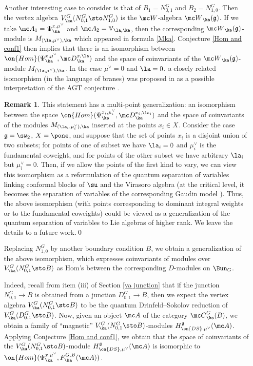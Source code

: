 \documentclass[11pt,reqno]{amsart}
\theoremstyle{plain}
\numberwithin{equation}{section}
\newcommand{\g}{\mathfrak{g}}
\theoremstyle{definition}
\newtheorem{rem}{Remark}[section]
\begin{document}
\bigskip

Another interesting case to consider is that of $B_1 = N^G_{0,1}$ and
$B_2 = N^G_{1,0}$. Then the vertex algebra $V^G_\ka(N^G_{0,1} \sto
N^G_{1,0})$ is the ${\mc W}$-algebra ${\mc W}_\ka(\g)$. If we take
${\mc A}_1 = \Psi^{x,\mu^\vee}_\ka$ and ${\mc A}_2 = {\mathbb
  V}_{\la,\ka}$, then the corresponding ${\mc W}_\ka(\g)$-module is
$M_{(\la,\mu^\vee),\ka}$ which appeared in formula
\eqref{Mka}. Conjecture \ref{Hom and conf1} then implies that there is
an isomorphism between $\on{Hom}(\Psi^{x,\mu^\vee}_\ka,{\mc
  D}^{x,\la}_\ka)$ and the space of coinvariants of the ${\mc
  W}_\ka(\g)$-module $M_{(\la,\mu^\vee),\ka}$. In the case $\mu^\vee =
0$ and $\la=0$, a closely related isomorphism (in the language of
branes) was proposed in \cite{NW} as a possible interpretation of the
AGT conjecture \cite{AGT}.

\begin{rem}
  This statement has a multi-point generalization: an isomorphism
  between the space $\on{Hom}(\Psi^{x_i,\mu^\vee_i}_\ka,{\mc
    D}^{x_i,\la_i}_\ka)$ and the space of coinvariants of the modules
  $M_{(\la_i,\mu^\vee_i),\ka}$ inserted at the points $x_i \in
  X$. Consider the case $\g=\sw_2$, $X=\pone$, and suppose that the
  set of points $x_i$ is a disjoint union of two subsets; for points
  of one of subset we have $\la_i=0$ and $\mu^\vee_i$ is the
  fundamental coweight, and for points of the other subset we have
  arbitrary $\la_i$ but $\mu^\vee_i=0$. Then, if we allow the
  points of the first kind to vary, we can view this isomorphism as a
  reformulation of the quantum separation of variables linking
  conformal blocks of $\su$ and the Virasoro algebra
  \cite{Stoyan,JT,FGT} (at the critical level, it becomes the
  separation of variables of the corresponding Gaudin model
  \cite{Frenkel1}). Thus, the above isomorphism (with points
  corresponding to dominant integral weights or to the fundamental
  coweights) could be viewed as a generalization of the quantum
  separation of variables to Lie algebras of higher rank. We leave the
  details to a future work.\qed
\end{rem}

Replacing $N^G_{1,0}$ by another boundary condition $B$, we obtain a
generalization of the above isomorphism, which expresses coinvariants
of modules over $V^G_\ka(N^G_{0,1} \sto B)$ as Hom's between the
corresponding $D$-modules on $\Bun_G$.

Indeed, recall from item (iii) of Section \ref{va junction} that if
the junction $N^G_{0,1} \to B$ is obtained from a junction $D^G_{0,1}
\to B$, then we expect the vertex algebra $V^G_\ka(N^G_{0,1} \sto B)$
to be the quantum Drinfeld--Sokolov reduction of $V^G_\ka(D^G_{0,1}
\sto B)$. Now, given an object ${\mc A}$ of the category ${\mc
  C}^G_\ka(B)$, we obtain a family of ``magnetic'' $V^G_\ka(N^G_{0,1}
\sto B)$-modules $H^{\g}_{\on{DS},\mu^\vee}({\mc A})$. Applying
Conjecture \ref{Hom and conf1}, we obtain that the space of
coinvariants of the $V^G_\ka(N^G_{0,1} \sto B)$-module
$H^{\g}_{\on{DS},\mu^\vee}({\mc A})$ is isomorphic to
$\on{Hom}(\Psi^{x,\mu^\vee}_\ka,F^{G,B}_\ka({\mc A}))$.
\end{document}
